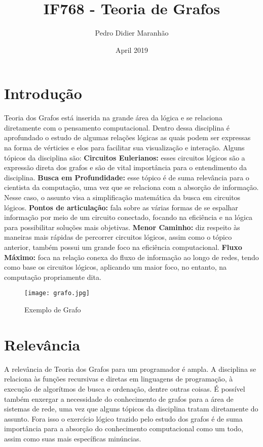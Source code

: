 \documentclass{article}
\title{IF768 - Teoria de Grafos}
\author{Pedro Didier Maranhão}
\date{April 2019}
\begin{document}
\maketitle

\section{Introdução}
Teoria dos Grafos está inserida na grande área da lógica e se relaciona diretamente com o pensamento computacional. Dentro dessa disciplina é aprofundado o estudo de algumas relações lógicas as quais podem ser expressas na forma de vérticies e elos para facilitar sua visualização e interação. Alguns tópicos da disciplina são: \newline \newline
\textbf{Circuitos Eulerianos:} esses circuitos lógicos são a expressão direta dos grafos e são de vital importância para o entendimento da disciplina. \citep{referenciasdisciplina} \newline
\textbf{Busca em Profundidade:} esse tópico é de suma relevância para o cientista da computação, uma vez que se relaciona com a absorção de informação. Nesse caso, o assunto visa a simplificação matemática da busca em circuitos lógicos. \citep{referenciasdisciplina2} \newline
\textbf{Pontos de articulação:} fala sobre as várias formas de se espalhar informação por meio de um circuito conectado, focando na eficiência e na lógica para possibilitar soluções mais objetivas. \citep{referenciasdisciplina3} \newline
\textbf{Menor Caminho:} diz respeito às maneiras mais rápidas de percorrer circuitos lógicos, assim como o tópico anterior, também possui um grande foco na eficiência computacional. \citep{referenciasdisciplina4} \newline
\textbf{Fluxo Máximo:} foca na relação conexa do fluxo de informação ao longo de redes, tendo como base os circuitos lógicos, aplicando um maior foco, no entanto, na computação propriamente dita. \citep{referenciasdisciplina5}

\begin{figure}[ht]
    \centering
    \texttt{[image: grafo.jpg]}
    \caption{Exemplo de Grafo}\cite{figura}
    \label{fig:my_label}
\end{figure}

\section{Relevância}
A relevância de Teoria dos Grafos para um programador é ampla. A disciplina se relaciona às funções recursivas e diretas em linguagens de programação, à execução de algorítmos de busca e ordenação, dentre outras coisas. É possível também enxergar a necessidade do conhecimento de grafos para a área de sistemas de rede, uma vez que alguns tópicos da disciplina tratam diretamente do assunto. Fora isso o exercício lógico trazido pelo estudo dos grafos é de suma importância para a absorção do conhecimento computacional como um todo, assim como suas mais específicas minúncias.
\end{document}
